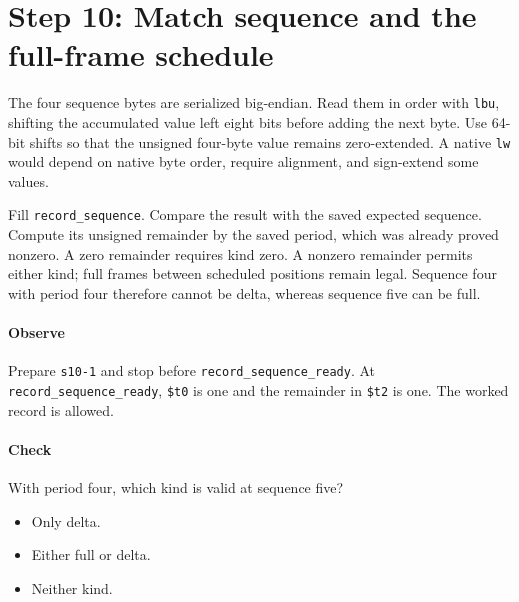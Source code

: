 \section{Step 10: Match sequence and the full-frame schedule}
The four sequence bytes are serialized big-endian. Read them in order with
\texttt{lbu}, shifting the accumulated value left eight bits before adding the
next byte. Use 64-bit shifts so that the unsigned four-byte value remains
zero-extended. A native \texttt{lw} would depend on native byte order, require
alignment, and sign-extend some values.

Fill \texttt{record\_sequence}. Compare the result with the saved expected
sequence. Compute its unsigned remainder by the saved period, which was already
proved nonzero. A zero remainder requires kind zero. A nonzero remainder permits
either kind; full frames between scheduled positions remain legal. Sequence four
with period four therefore cannot be delta, whereas sequence five can be full.

\paragraph{Observe} Prepare \texttt{s10-1} and stop before
\texttt{record\_sequence\_ready}. At \texttt{record\_sequence\_ready}, \texttt{\$t0} is one
and the remainder in \texttt{\$t2} is one. The worked record is allowed.

\paragraph{Check} With period four, which kind is valid at sequence five?
\begin{itemize}
  \item[A.] Only delta.
  \item[B.] Either full or delta.
  \item[C.] Neither kind.
\end{itemize}
